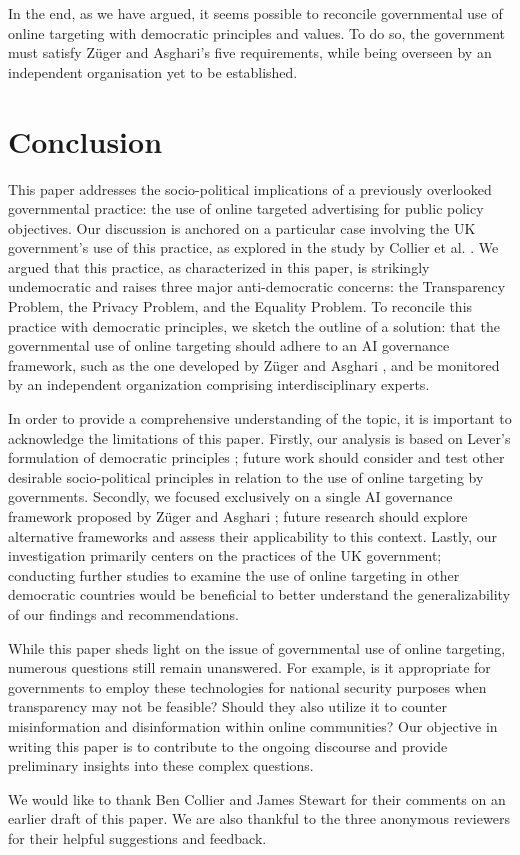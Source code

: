 \documentclass[preprint]{acmart}
\begin{document}
In the end, as we have argued, it seems possible to reconcile governmental use of online targeting with democratic principles and values. To do so, the government must satisfy Züger and Asghari's five requirements, while being overseen by an independent organisation yet to be established.  


\section{Conclusion}

This paper addresses the socio-political implications of a previously overlooked governmental practice: the use of online targeted advertising for public policy objectives. Our discussion is anchored on a particular case involving the UK government's use of this practice, as explored in the study by Collier et al. \cite{Collier2022}. We argued that this practice, as characterized in this paper, is strikingly undemocratic and raises three major anti-democratic concerns: the Transparency Problem, the Privacy Problem, and the Equality Problem. To reconcile this practice with democratic principles, we sketch the outline of a solution: that the governmental use of online targeting should adhere to an AI governance framework, such as the one developed by Züger and Asghari \cite{zuger2022}, and be monitored by an independent organization comprising interdisciplinary experts.





In order to provide a comprehensive understanding of the topic, it is important to acknowledge the limitations of this paper. Firstly, our analysis is based on Lever's formulation of democratic principles \cite{lever2006}; future work should consider and test other desirable socio-political principles in relation to the use of online targeting by governments. Secondly, we focused exclusively on a single AI governance framework proposed by Züger and Asghari \cite{zuger2022}; future research should explore alternative frameworks and assess their applicability to this context. Lastly, our investigation primarily centers on the practices of the UK government; conducting further studies to examine the use of online targeting in other democratic countries would be beneficial to better understand the generalizability of our findings and recommendations.


While this paper sheds light on the issue of governmental use of online targeting, numerous questions still remain unanswered. For example, is it appropriate for governments to employ these technologies for national security purposes when transparency may not be feasible? Should they also utilize it to counter misinformation and disinformation within online communities? Our objective in writing this paper is to contribute to the ongoing discourse and provide preliminary insights into these complex questions.


\begin{acks}
We would like to thank Ben Collier and James Stewart for their comments on an earlier draft of this paper. We are also thankful to the three anonymous reviewers for their helpful suggestions and feedback.
\end{acks}




\end{document}
